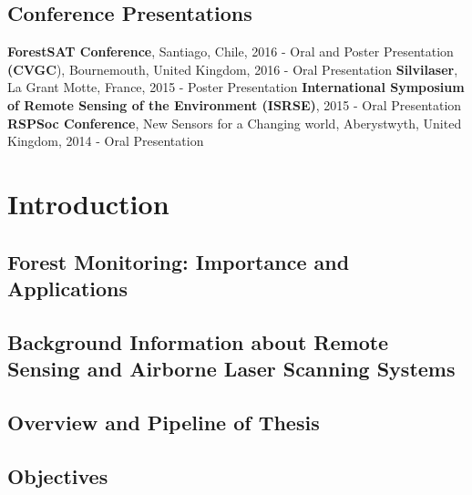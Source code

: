 \documentclass[11pt,nofootinbib]{report}
\begin{document}
	
	\section{Conference Presentations}
		\textbf{ForestSAT Conference}, Santiago, Chile, 2016 - Oral and Poster Presentation \newline
		\textbf{(CVGC}), Bournemouth, United Kingdom, 2016 - Oral Presentation \newline
		\textbf{Silvilaser}, La Grant Motte, France, 2015 - Poster Presentation \newline
		\textbf{International Symposium of Remote Sensing of the Environment 	(ISRSE)}, 2015 - Oral Presentation\newline
		\textbf{RSPSoc Conference}, New Sensors for a Changing world, Aberystwyth, United Kingdom, 2014 - Oral Presentation \newline
	
	
	
    \tableofcontents	 
		\newpage  
	\cleardoublepage
	\listoffigures
	
	
		
		
	\setcounter{secnumdepth}{4}		
	\chapter{Introduction} \label{Introduction}
		\section{Forest Monitoring: Importance and Applications}
			
		\section{Background Information about Remote Sensing and Airborne Laser Scanning Systems}\label{Background}
			
			\newpage
		
		\section{Overview and Pipeline of Thesis} \label{Overview}
		
				
		\section{Objectives}\label{Aims}
			
\end{document}
